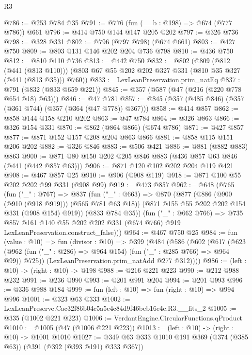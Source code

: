 \begin{lexlean}{R3}
\begin{coremodule}
@786 := @253 @784 @35
@791 := @776 (fun (__b : @198) => @674 (@777 @786)) @661
@796 := @414 @750 @144 @147 @205 @202
@797 := @326 @736
@798 := @328 @331
@802 := @796 (@797 @798) (@674 @661)
@803 := @427 @750
@809 := @803 @131 @146 @202 @204 @736 @798
@810 := @436 @750
@812 := @810 @110 @736
@813 := @442 @750
@832 := @802
    (@809
      (@812 (@441 (@813 @110)))
      (@803 @67 @55 @202 @202 @327 @331 (@810 @35 @327 (@441 (@813 @35))) @760))
@833 := LexLeanPreservation.prim_natEq
@837 := @791 (@832 (@833 @659 @221))
@845 := @357 (@587 (@47 (@216 (@220 @778 @654 @18) @63)))
@846 := @47 @781
@857 := @845 (@357 (@485 @846) (@357 (@361 @744) (@357 (@364 (@47 @778)) @367)))
@858 := @414 @857
@862 := @858 @144 @158 @210 @202
@863 := @47 @784
@864 := @326 @863
@866 := @326 @154 @331
@870 := @862 (@864 @866) (@674 @786)
@871 := @427 @857
@877 := @871 @152 @157 @208 @204 @863 @866
@881 := @858 @115 @151 @206 @202
@882 := @326 @846
@883 := @506 @421
@886 := @881 (@882 @883) @863
@900 := @871 @80 @150 @202 @205 @846 @883 (@436 @857 @63 @846 (@441 (@442 @857 @63)))
@906 := @871 @120 @102 @202 @204 @119 @421
@908 := @467 @857 @25
@910 := @906 (@908 @119)
@918 := @871 @100 @55 @202 @202 @99 @331 (@908 @99)
@919 := @473 @857
@962 := @648
    (@765
      (fun ("_" : @767) =>
      @837
        (fun ("_" : @663) =>
        @870
          (@877
            (@886 (@900 (@910 (@918 @919))) (@565 @781 @63 @18))
            (@871 @155 @55 @202 @202 @154 @331 (@908 @154) @919))
          (@833 @784 @35))
        (fun ("_" : @662 @766) =>
        @735
          @857
          @161
          @140
          @55
          @202
          @202
          @331
          (@674 @766)
          @919
          LexLeanPreservation.construct_false)))
@964 := @467 @750 @25
@984 := fun (value : @10) =>
  fun (divisor : @10) =>
  @399
    (@484
      (@586
        (@602
          (@617
            (@623 (@962 (fun ("_" : @286) => @964 @154) (fun ("_" : @285 @766) => @964 @99)) @725))
          (LexLeanPreservation.prim_natAdd @277 @312))))
@986 := (left : @10) -> (right : @10) -> @198
@988 := @216 @221 @223
@990 := @212 @988 @232
@991 := @236 @990
@993 := @201 @991 @204
@994 := @201 @993
@996 := @336 @988 @184
@999 := fun (left : @10) => fun (right : @10) => @994 @996
@1001 := @323 @63 @333
@1002 := LexLeanPreserve.Cac32f86b04c5a5e4c84d9f46beb16e4c.R3.__fits_2
@1005 := @335 (@1002 @221 @223)
@1006 := VerdantEngine.CircularFunctions.qProduct
@1010 := @1005 (@47 (@1006 @221 @223))
@1013 := (left : @10) -> (right : @10) -> @1001 @1010
@1027 := @349 @63 @333 @1010 @191 @369 (@374 (@385 @63)) (@391 (@392 (@393 @191) @333 @367))

\end{coremodule}
\end{lexlean}
